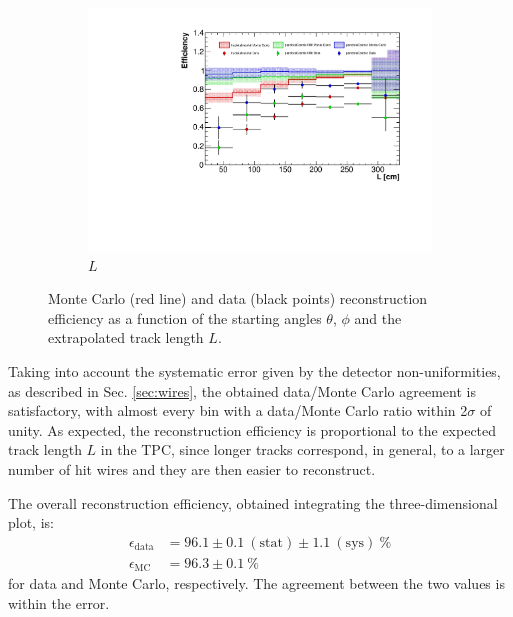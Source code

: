 \documentclass[a4paper]{scrartcl}
\begin{document}
\begin{figure}[htbp]
\begin{center}
\begin{subfigure}{0.6\textwidth}
      \includegraphics[width=\linewidth]{figures/l.pdf}
      \caption{$L$} \label{fig:l}
    \end{subfigure}
    \caption{Monte Carlo (red line) and data (black points) reconstruction efficiency as a function of the starting angles $\theta$, $\phi$ and the extrapolated track length $L$.}\label{fig:1d}
  \end{center}
\end{figure}

Taking into account the systematic error given by the detector non-uniformities, as described in Sec. \ref{sec:wires}, the obtained data/Monte Carlo agreement is satisfactory, with almost every bin with a data/Monte Carlo ratio within 2$\sigma$ of unity. As expected, the reconstruction efficiency is proportional to the expected track length $L$ in the TPC, since longer tracks correspond, in general, to a larger number of hit wires and they are then easier to reconstruct.

The overall reconstruction efficiency, obtained integrating the three-dimensional plot, is:
\begin{align*}
\epsilon_{\mathrm{data}} &= 96.1 \pm 0.1~\mathrm{(stat)} \pm 1.1~\mathrm{(sys)}~\%\\
\epsilon_{\mathrm{MC}} &= 96.3 \pm 0.1~\%
\end{align*} for data and Monte Carlo, respectively. The agreement between the two values is within the error.
\end{document}
